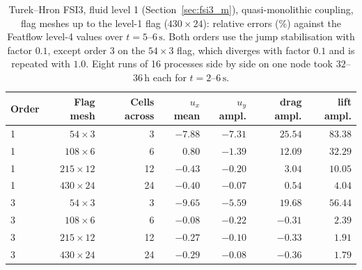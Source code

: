 \begin{table}[htbp]
	\centering
	\footnotesize
	\setlength{\tabcolsep}{3pt}
	\caption{Turek--Hron FSI3, fluid level 1 (Section~\ref{sec:fsi3_m}), quasi-monolithic coupling, flag meshes up to the level-1 flag ($430\times24$): relative errors (\%) against the Featflow level-4 values over $t = 5$--$6\,\mathrm{s}$. Both orders use the jump stabilisation with factor $0.1$, except order 3 on the $54\times3$ flag, which diverges with factor $0.1$ and is repeated with $1.0$. Eight runs of 16 processes side by side on one node took $32$--$36\,\mathrm{h}$ each for $t = 2$--$6\,\mathrm{s}$.}
	\label{tab:ho_fsi3}
	\begin{tabular}{lrrrrrr}
		\toprule
		Order & Flag mesh & Cells across & $u_x$ mean & $u_y$ ampl. & drag ampl. & lift ampl. \\
		\midrule
		1 & $54\times3$   & 3  & $-7.88$ & $-7.31$ & $25.54$ & $83.38$ \\
		1 & $108\times6$  & 6  & $0.80$  & $-1.39$ & $12.09$ & $32.29$ \\
		1 & $215\times12$ & 12 & $-0.43$ & $-0.20$ & $3.04$  & $10.05$ \\
		1 & $430\times24$ & 24 & $-0.40$ & $-0.07$ & $0.54$  & $4.04$ \\
		3 & $54\times3$   & 3  & $-9.65$ & $-5.59$ & $19.68$ & $56.44$ \\
		3 & $108\times6$  & 6  & $-0.08$ & $-0.22$ & $-0.31$ & $2.39$ \\
		3 & $215\times12$ & 12 & $-0.27$ & $-0.10$ & $-0.33$ & $1.91$ \\
		3 & $430\times24$ & 24 & $-0.29$ & $-0.08$ & $-0.36$ & $1.79$ \\
		\bottomrule
	\end{tabular}
\end{table}

